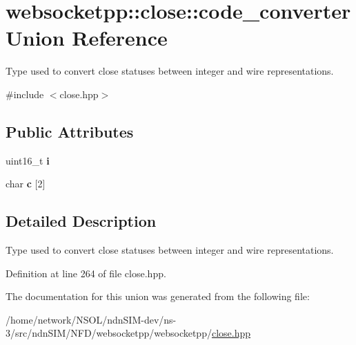 \hypertarget{unionwebsocketpp_1_1close_1_1code__converter}{}\section{websocketpp\+:\+:close\+:\+:code\+\_\+converter Union Reference}
\label{unionwebsocketpp_1_1close_1_1code__converter}


Type used to convert close statuses between integer and wire representations.  




{\ttfamily \#include $<$close.\+hpp$>$}

\subsection*{Public Attributes}
\begin{DoxyCompactItemize}
\item 
uint16\+\_\+t {\bfseries i}\hypertarget{unionwebsocketpp_1_1close_1_1code__converter_aa8ed980b85e36e51a24f7eb95c2c3bf7}{}\label{unionwebsocketpp_1_1close_1_1code__converter_aa8ed980b85e36e51a24f7eb95c2c3bf7}

\item 
char {\bfseries c} \mbox{[}2\mbox{]}\hypertarget{unionwebsocketpp_1_1close_1_1code__converter_ad9a9b5ad77cd94c1ac521a3524e42962}{}\label{unionwebsocketpp_1_1close_1_1code__converter_ad9a9b5ad77cd94c1ac521a3524e42962}

\end{DoxyCompactItemize}


\subsection{Detailed Description}
Type used to convert close statuses between integer and wire representations. 

Definition at line 264 of file close.\+hpp.



The documentation for this union was generated from the following file\+:\begin{DoxyCompactItemize}
\item 
/home/network/\+N\+S\+O\+L/ndn\+S\+I\+M-\/dev/ns-\/3/src/ndn\+S\+I\+M/\+N\+F\+D/websocketpp/websocketpp/\hyperlink{close_8hpp}{close.\+hpp}\end{DoxyCompactItemize}
